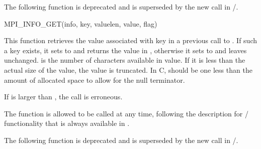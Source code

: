 \deprecatedsep
The following function is deprecated and is superseded by the new
 call in \mpiivdoto/. 

%
\begin{funcdef}{MPI\_INFO\_GET}{(\mbox{info}, \mbox{key}, \mbox{valuelen}, \mbox{value}, \mbox{flag})}
\end{funcdef}

This function retrieves the value associated with key in a previous call to 
. If such a key exists, it sets  to  
and returns the value in ,
otherwise it sets  to  and leaves
 unchanged. 
 is the number of characters available in 
value. If it is less than the actual size of the value, the value is
truncated. In C,  should
be one less than the amount of allocated space to allow
for the null terminator. 

If  is larger than , 
the call is erroneous. 

The function  is allowed to be called at any time, following the description for \MPI/ functionality that is always available in .

\deprecatedsep
The following function is deprecated and is superseded by the new
 call in \mpiivdoto/. 

